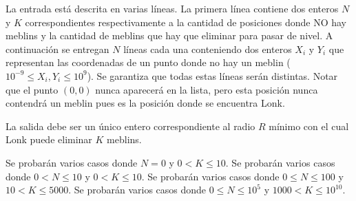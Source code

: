 \documentclass{oci}
\begin{document}
\newpage
\begin{inputDescription}
  La entrada está descrita en varias líneas.
  La primera línea contiene dos enteros $N$ y $K$ correspondientes
  respectivamente a la cantidad de posiciones donde NO hay meblins y la cantidad
  de meblins que hay que eliminar para pasar de nivel.
  A continuación se entregan $N$ líneas cada una conteniendo dos enteros $X_i$ y
  $Y_i$ que representan las coordenadas de un punto donde no hay un meblin
  ($10^{-9}\leq X_i, Y_i\leq 10^9$).
  Se garantiza que todas estas líneas serán distintas.
  Notar que el punto $(0, 0)$ nunca aparecerá en la lista, pero esta posición nunca
  contendrá un meblin pues es la posición donde se encuentra Lonk.
\end{inputDescription}

\begin{outputDescription}
  La salida debe ser un único entero correspondiente al radio $R$
  mínimo con el cual Lonk puede eliminar $K$ meblins.
\end{outputDescription}

\begin{scoreDescription}
 Se probarán varios casos donde $N=0$ y $0 < K \leq 10$.
 Se probarán varios casos donde $0 < N \leq 10$ y $0 < K \leq 10$.
 Se probarán varios casos donde $0 \leq N \leq 100$ y $10 < K \leq 5000$.
 Se probarán varios casos donde $0 \leq N \leq 10^5$ y $1000 < K \leq 10^{10}$.
\end{scoreDescription}

\begin{sampleDescription}
\end{sampleDescription}
\end{document}
